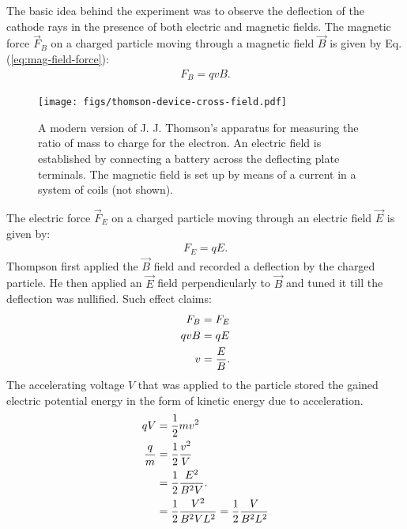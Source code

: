\documentclass[12pt,b4paper]{article}
\begin{document}
The basic idea behind the experiment was to observe the deflection of the cathode rays in the presence of both electric and magnetic fields. The magnetic force $\vec{F}_B$ on a charged particle moving through a magnetic field $\vec{B}$ is given by Eq. (\ref{eq:mag-field-force}):
\begin{align}
    F_B=qvB.
\end{align}
\begin{figure}
    \centering
    \texttt{[image: figs/thomson-device-cross-field.pdf]}
    \caption{A modern version of J. J. Thomson’s apparatus for measuring the ratio of mass to charge for the electron. An electric field is established by connecting a battery across the deflecting plate terminals. The magnetic field is set up by means of a current in a system of coils (not shown).}
    \label{fig:cathode-ray-tube}
\end{figure}
The electric force $\vec{F}_E$ on a charged particle moving through an electric field $\vec{E}$ is given by:
\begin{align}
    F_E=qE.
\end{align}
Thompson first applied the $\vec{B}$ field and recorded a deflection by the charged particle. He then applied an $\vec{E}$ field perpendicularly to $\vec{B}$ and tuned it till the deflection was nullified. Such effect claims:
\begin{align}
    F_B&=F_E\notag\\
    qvB&=qE\notag\\
    v&=\frac{E}{B}.
\end{align}
The accelerating voltage $V$ that was applied to the particle stored the gained electric potential energy in the form of kinetic energy due to acceleration.
\begin{align}
    qV&=\frac{1}{2}mv^2\notag\\
    \frac{q}{m}&=\frac{1}{2}\frac{v^2}{V}\notag\\
    &=\frac{1}{2}\frac{E^2}{B^2V}.\\
    &=\frac{1}{2}\frac{V^2}{B^2VL^2}=\frac{1}{2}\frac{V}{B^2L^2}
\end{align}
\end{document}
